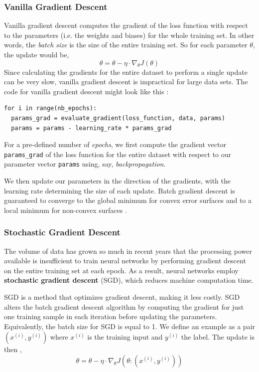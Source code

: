\documentclass{article}
\begin{document}
   \subsubsection{Vanilla Gradient Descent}
  \label{subsub:Vanilla Gradient Descent}
Vanilla gradient descent computes the gradient of the loss function with respect to the parameters (i.e. the weights and biases) for the whole training set. In other words, the \textit{batch size} is the size of the entire training set. So for each parameter $\theta$, the update would be, 
   $$ \theta =\theta - \eta \cdot \nabla_{\theta}J(\theta) $$
Since calculating the gradients for the entire dataset to perform a single update can be very slow, vanilla gradient descent is impractical for large data sets. The code for vanilla gradient descent might look like this \citep{ruder2017overview}:
\begin{verbatim}
for i in range(nb_epochs):
  params_grad = evaluate_gradient(loss_function, data, params)
  params = params - learning_rate * params_grad
\end{verbatim}
For a pre-defined number of \textit{epochs}, we first compute the gradient vector \texttt{params\_grad} of the loss function for the entire dataset with respect to our parameter vector \texttt{params} using, say, \textit{backpropagation}. 

   We then update our parameters in the direction of the gradients, with the learning rate determining the size of each update. Batch gradient descent is guaranteed to converge to the global minimum for convex error surfaces and to a local minimum for non-convex surfaces \citep{ruder2017overview}.
\subsubsection{Stochastic Gradient Descent}%
  \label{subsub:Stochastic Gradient Descent}

The volume of data has grown so much in recent years that the processing power available is insufficient to train neural networks by performing gradient descent on the entire training set at each epoch. As a result, neural networks employ \textbf{stochastic gradient descent} (SGD), which reduces machine computation time. 

   SGD is a method that optimizes gradient descent, making it less costly. SGD alters the batch gradient descent algorithm by computing the gradient for just one training sample in each iteration before updating the parameters. Equivalently, the batch size for SGD is equal to 1. We define an example as a pair $(x^{(i)}, y^{(i)})$ where $x^{(i)}$ is the training input and $y^{(i)}$ the label. The update is then \citep{ruder2017overview},
   $$\theta = \theta - \eta \cdot \nabla_\theta J(\theta :(x^{(i)}, y^{(i)}) ) $$
\end{document}
